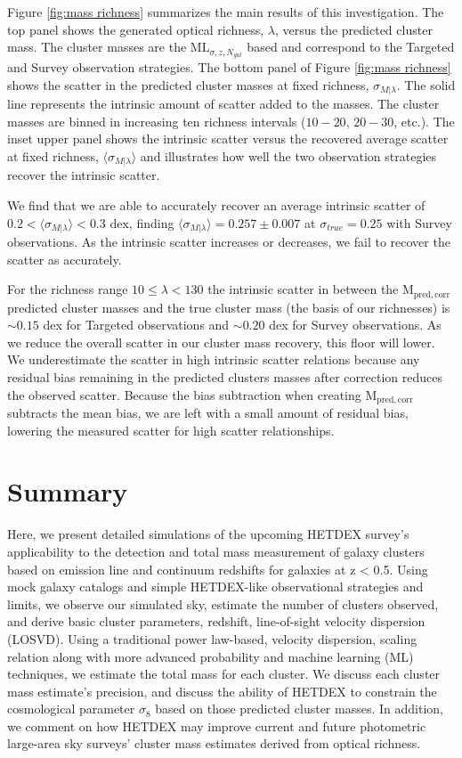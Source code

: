 \documentclass[fleqn,usenatbib]{mnras}
\begin{document}
Figure \ref{fig:mass richness} summarizes the main results of this investigation. The top panel shows the generated optical richness, $\lambda$, versus the predicted cluster mass. The cluster masses are the $\mathrm{ML}_{\sigma, z, N_{gal}}$ based and correspond to the Targeted and Survey observation strategies. The bottom panel of Figure \ref{fig:mass richness} shows the scatter in the predicted cluster masses at fixed richness, $\sigma_{M|\lambda}$. The solid line represents the intrinsic amount of scatter added to the masses. The cluster masses are binned in increasing ten richness intervals ($10-20$, $20-30$, etc.). The inset upper panel shows the intrinsic scatter versus the recovered average scatter at fixed richness, $\langle \sigma_{M|\lambda} \rangle$ and illustrates how well the two observation strategies recover the intrinsic scatter. 

We find that we are able to accurately recover an average intrinsic scatter of $0.2 <\langle \sigma_{M|\lambda} \rangle <0.3$ dex, finding $\langle \sigma_{M|\lambda} \rangle = 0.257\pm0.007$ at $\sigma_{true} = 0.25$ with Survey observations. As the intrinsic scatter increases or decreases, we fail to recover the scatter as accurately.

For the richness range $10 \leq \lambda < 130$ the intrinsic scatter in between the $\mathrm{M_{pred,corr}}$ predicted cluster masses and the true cluster mass (the basis of our richnesses) is $\sim0.15$ dex for Targeted observations and $\sim0.20$ dex for Survey observations. As we reduce the overall scatter in our cluster mass recovery, this floor will lower. We underestimate the scatter in high intrinsic scatter relations because any residual bias remaining in the predicted clusters masses after correction reduces the observed scatter. Because the bias subtraction when creating $\mathrm{M_{pred,corr}}$ subtracts the mean bias, we are left with a small amount of residual bias, lowering the measured scatter for high scatter relationships.

\section{Summary}\label{sec:summary}
Here, we present detailed simulations of the upcoming HETDEX survey's applicability to the detection and total mass measurement of galaxy clusters based on emission line and continuum redshifts for galaxies at z < 0.5. Using mock galaxy catalogs and simple HETDEX-like observational strategies and limits, we observe our simulated sky, estimate the number of clusters observed, and derive basic cluster parameters, redshift, line-of-sight velocity dispersion (LOSVD). Using a traditional power law-based, velocity dispersion, scaling relation along with more advanced probability and machine learning (ML) techniques, we estimate the total mass for each cluster. We discuss each cluster mass estimate's precision, and discuss the ability of HETDEX to constrain the cosmological parameter $\sigma_8$ based on those predicted cluster masses. In addition, we comment on how HETDEX may improve current and future photometric large-area sky surveys' cluster mass estimates derived from optical richness.
\end{document}
